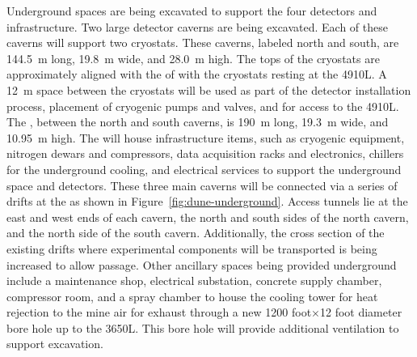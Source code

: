 Underground spaces are being excavated to support the four
 detectors and infrastructure.  Two large detector caverns
are being excavated.  Each of these caverns will support two
\larmass cryostats.  These caverns, labeled north and
south, are \SI{144.5}{\meter} long, \SI{19.8}{\meter} wide,  and 
\SI{28.0}{\meter} high. The tops of the cryostats are approximately
aligned with the  of  with the cryostats resting
at the 4910L.  A \SI{12}{\meter} space between the cryostats will
be used as part of the detector installation process, placement of
cryogenic pumps and valves, and for access to the 4910L.  The
, between the north and south caverns, is \SI{190}{\meter}
long, \SI{19.3}{\meter} wide, and \SI{10.95}{\meter} high.  The
 will house infrastructure items, such as cryogenic
equipment, nitrogen dewars and compressors, data acquisition racks and
electronics, chillers for the underground cooling, and electrical
services to support the underground space and detectors.  These three
main caverns will be connected via a series of drifts at the  as shown in
Figure~\ref{fig:dune-underground}. Access tunnels lie at the east and
west ends of each cavern, the north and south sides of the north cavern, and
the north side of the south cavern. Additionally, the cross section of the
existing drifts where experimental components will be transported is
being increased to allow passage.  Other ancillary spaces being
provided underground include a maintenance shop, electrical
substation, concrete supply chamber, compressor room, and  a spray chamber
to house the cooling tower for heat rejection to the mine air for
exhaust through a new 1200 foot$\times$12 foot diameter bore hole up
to the 3650L.  This bore hole will provide additional ventilation
to support excavation.

